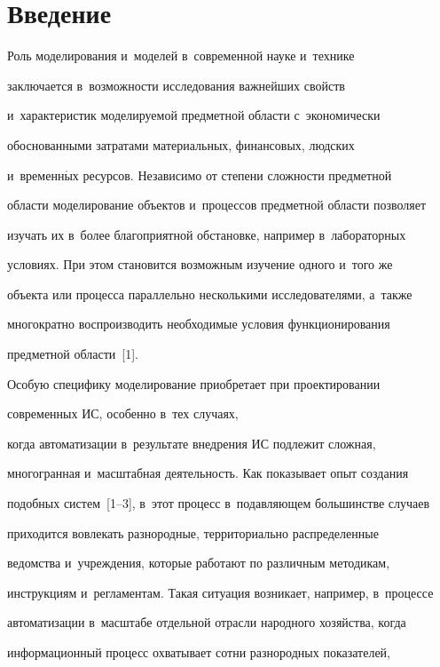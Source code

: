 \section{Введение}





    Роль моделирования и~моделей в~современной науке и~технике 


заключается в~возможности исследования важнейших свойств 


и~характеристик моделируемой предметной области с~экономически 


обоснованными затратами материальных, финансовых, людских 


и~временн$\acute{\mbox{ы}}$х ресурсов. Независимо от степени слож\-ности предметной 


области моделирование объектов и~процессов предметной области позволяет 


изучать их в~более благоприятной обстановке, например в~лабораторных 


условиях. При этом становится возможным изучение одного и~того же 


объекта или процесса параллельно несколькими исследователями, а~также 


многократно воспроизводить необходимые условия функционирования 


предметной области~[1].


    


    Особую специфику моделирование приобретает при проектировании 


современных ИС, особенно в~тех случаях, 


когда автоматизации в~результате внед\-ре\-ния ИС подлежит слож\-ная, 


многогранная и~мас\-штаб\-ная деятельность. Как показывает опыт создания 


подобных сис\-тем~[1--3], в~этот процесс в~по\-дав\-ля\-ющем большинстве случаев 


приходится вовлекать разнородные, территориально распределенные 


ведомства и~учреждения, которые работают по различным методикам, 


инструкциям и~регламентам. Такая ситуация возникает, например, в~процессе 


автоматизации в~масштабе отдельной отрасли народного хозяйства, когда 


информационный процесс охватывает сотни разнородных показателей, 


